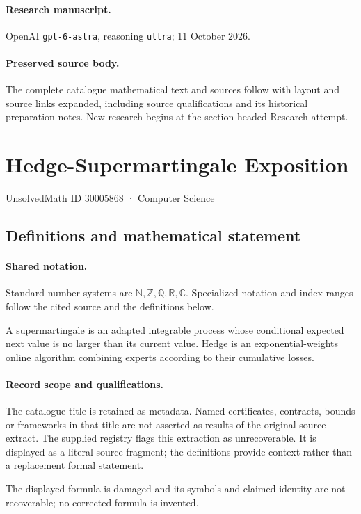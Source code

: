 \documentclass[11pt]{article}
\begin{document}
\paragraph{Research manuscript.} OpenAI \texttt{gpt-6-astra}, reasoning \texttt{ultra}; 11 October 2026.
\paragraph{Preserved source body.} The complete catalogue mathematical text and sources follow with layout and source links expanded, including source qualifications and its historical preparation notes. New research begins at the section headed Research attempt.

\section{Hedge-Supermartingale Exposition}\label{30005868}
{\small UnsolvedMath ID 30005868 · Computer Science}
\subsection{Definitions and mathematical statement}

\paragraph{Shared notation.}Standard number systems are $\mathbb N,\mathbb Z,\mathbb Q,\mathbb R,\mathbb C$. Specialized notation and index ranges follow the cited source and the definitions below.


A supermartingale is an adapted integrable process whose conditional expected next value is no larger than its current value. Hedge is an exponential-weights online algorithm combining experts according to their cumulative losses.
\paragraph{Record scope and qualifications.}
The catalogue title is retained as metadata. Named certificates, contracts, bounds or frameworks in that title are not asserted as results of the original source extract.
The supplied registry flags this extraction as unrecoverable. It is displayed as a literal source fragment; the definitions provide context rather than a replacement formal statement.

The displayed formula is damaged and its symbols and claimed identity are not recoverable; no corrected formula is invented.
\end{document}
